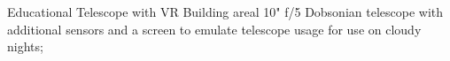 \project
    {Educational Telescope with VR}
    {
        Building areal 10" f/5 Dobsonian telescope with additional sensors and a screen to emulate
        telescope usage for use on cloudy nights;
    }
